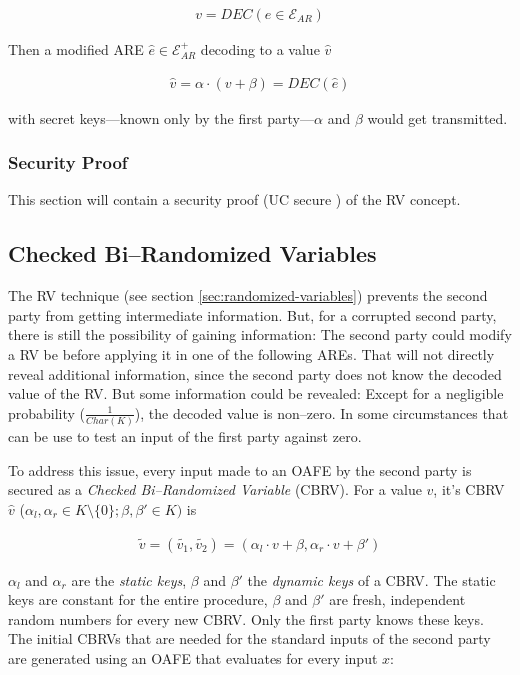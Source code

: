 \documentclass[12pt, a4paper]{article}
\begin{document}
\begin{align}
  v = DEC(e \in \mathcal{E}_{AR})
\end{align}

\noindent{}Then a modified ARE $\hat{e} \in \mathcal{E}_{AR}^+$ decoding to a
value $\hat{v}$

\begin{align}
\hat{v} = \alpha \cdot (v + \beta) = DEC(\hat{e})
\end{align}

\noindent{}with secret keys---known only by the first party---$\alpha$ and
$\beta$ would get transmitted.

\subsubsection{Security Proof}
\label{sec:randomized-variables-proof}

This section will contain a security proof (UC secure \cite{canetti05}) of the
RV concept.


\subsection{Checked Bi--Randomized Variables}
\label{sec:bi-randomized-variables}

The RV technique (see section \ref{sec:randomized-variables}) prevents the
second party from getting intermediate information. But, for a corrupted second
party, there is still the possibility of gaining information: The second party
could modify a RV be before applying it in one of the following AREs. That will
not directly reveal additional information, since the second party does not know
the decoded value of the RV. But some information could be revealed: Except for
a negligible probability ($\frac{1}{Char(K)}$), the decoded value is non--zero.
In some circumstances that can be use to test an input of the first party
against zero.

To address this issue, every input made to an OAFE by the second party is
secured as a \emph{Checked Bi--Randomized Variable} (CBRV). For a value $v$,
it's CBRV $\hat{v}$ ($\alpha_l, \alpha_r \in K \setminus \{0\}; \beta, \beta'
\in K)$ is

\begin{align}
  \widetilde{v} = (\widetilde{v_1}, \widetilde{v_2}) =
  (\alpha_l \cdot v + \beta, \alpha_r \cdot v + \beta')
\end{align}

$\alpha_l$ and $\alpha_r$ are the \emph{static keys}, $\beta$ and $\beta'$ the
\emph{dynamic keys} of a CBRV. The static keys are constant for the entire
procedure, $\beta$ and $\beta'$ are fresh, independent random numbers for every
new CBRV. Only the first party knows these keys. The initial CBRVs that are
needed for the standard inputs of the second party are generated using an OAFE
that evaluates for every input $x$:
\end{document}
